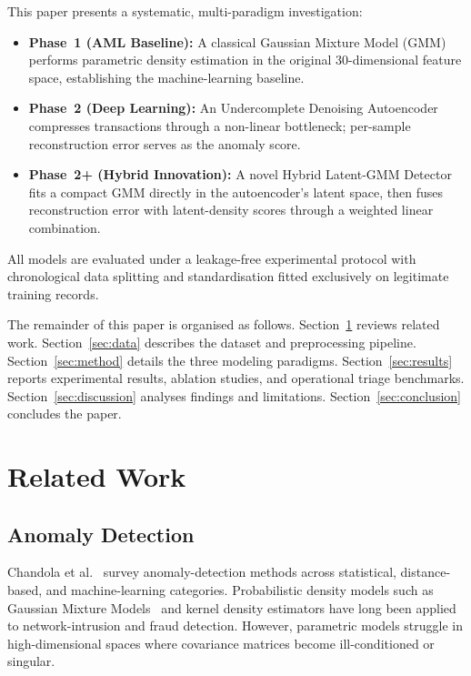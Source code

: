 \documentclass[conference,10pt]{IEEEtran}
\begin{document}
This paper presents a systematic, multi-paradigm investigation:

\begin{itemize}[leftmargin=*]
\item \textbf{Phase~1 (AML Baseline):} A classical Gaussian Mixture Model
      (GMM) performs parametric density estimation in the original 30-dimensional
      feature space, establishing the machine-learning baseline.
\item \textbf{Phase~2 (Deep Learning):} An Undercomplete Denoising Autoencoder
      compresses transactions through a non-linear bottleneck; per-sample
      reconstruction error serves as the anomaly score.
\item \textbf{Phase~2+ (Hybrid Innovation):} A novel Hybrid Latent-GMM
      Detector fits a compact GMM directly in the autoencoder's latent space,
      then fuses reconstruction error with latent-density scores through a
      weighted linear combination.
\end{itemize}

All models are evaluated under a leakage-free experimental protocol with
chronological data splitting and standardisation fitted exclusively on
legitimate training records.

The remainder of this paper is organised as follows.
Section~\ref{sec:related} reviews related work.
Section~\ref{sec:data} describes the dataset and preprocessing pipeline.
Section~\ref{sec:method} details the three modeling paradigms.
Section~\ref{sec:results} reports experimental results, ablation studies, and
operational triage benchmarks.
Section~\ref{sec:discussion} analyses findings and limitations.
Section~\ref{sec:conclusion} concludes the paper.

\section{Related Work}
\label{sec:related}

\subsection{Anomaly Detection}
Chandola et al.~\cite{chandola2009} survey anomaly-detection methods across
statistical, distance-based, and machine-learning categories.  Probabilistic
density models such as Gaussian Mixture Models~\cite{dempster1977} and kernel
density estimators have long been applied to network-intrusion and fraud
detection.  However, parametric models struggle in high-dimensional spaces
where covariance matrices become ill-conditioned or singular.
\end{document}

